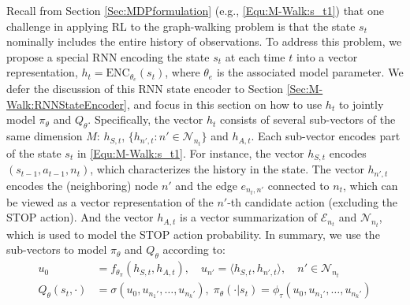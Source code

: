 \documentclass{article}
\newcommand{\mc}{\mathcal}
\newcommand{\modelname}{M-Walk}
\begin{document}
	Recall from Section \ref{Sec:MDPformulation} (e.g., \eqref{Equ:\modelname:s_t1}) that one challenge in applying RL to the graph-walking problem is that the state $s_t$ nominally includes the entire history of observations. To address this problem, we propose a special RNN encoding the state $s_t$ at each time $t$ into a vector representation, $h_t = \mathrm{ENC}_{\theta_e}(s_t)$, where $\theta_e$ is the associated model parameter. We defer the discussion of this RNN state encoder to Section \ref{Sec:\modelname:RNNStateEncoder}, and focus in this section on how to use $h_t$ to jointly model $\pi_{\theta}$ and $Q_{\theta}$. Specifically, the vector  $h_t$ consists of several sub-vectors of the same dimension $M$: $h_{S,t}$,  $\{h_{n',t}: n' \in \mc{N}_{n_t}\}$ and $h_{A,t}$. Each sub-vector encodes part of the state $s_t$ in \eqref{Equ:\modelname:s_t1}. For instance, the vector $h_{S,t}$ encodes $(s_{t-1}, a_{t-1}, n_t)$, which characterizes the history in the state. The vector $h_{n',t}$ encodes the (neighboring) node $n'$ and the edge $e_{n_t,n'}$ connected to $n_t$, which can be viewed as a vector representation of the $n'$-th candidate action (excluding the STOP action). And the vector $h_{A,t}$ is a vector summarization of $\mc{E}_{n_t}$ and $\mc{N}_{n_t}$, which is used to model the STOP action probability. In summary, we use the sub-vectors to model $\pi_{\theta}$ and $Q_{\theta}$ according to:
    	\begin{align}
        	u_0		&=
        	f_{\theta_{\pi}}(h_{S,t}, h_{A,t}), \quad
        	u_{n'}	=
        	\langle h_{S,t}, h_{n',t} \rangle, \quad n' \in \mc{N}_{n_t}
        	\label{Equ:\modelname:u}
        	\\
        	Q_{\theta}(s_t, \cdot)
        	&=
        	\sigma(u_0, u_{n_1'},\ldots,u_{n_k'}),
        	\;
        	\pi_{\theta}(\cdot | s_t)
        	=
        	\phi_{\tau}(u_0, u_{n_1'},\ldots,u_{n_k'})
        	\label{Equ:\modelname:PolicyNet}
    	\end{align}
\end{document}
